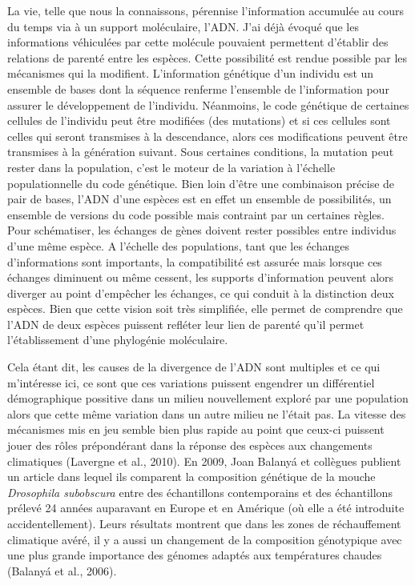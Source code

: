 La vie, telle que nous la connaissons, pérennise l'information accumulée
au cours du temps via à un support moléculaire, l'ADN. J'ai déjà évoqué
que les informations véhiculées par cette molécule pouvaient permettent
d'établir des relations de parenté entre les espèces. Cette possibilité
est rendue possible par les mécanismes qui la modifient. L'information
génétique d'un individu est un ensemble de bases dont la séquence
renferme l'ensemble de l'information pour assurer le développement de
l'individu. Néanmoins, le code génétique de certaines cellules de
l'individu peut être modifiées (des mutations) et si ces cellules sont
celles qui seront transmises à la descendance, alors ces modifications
peuvent être transmises à la génération suivant. Sous certaines
conditions, la mutation peut rester dans la population, c'est le moteur
de la variation à l'échelle populationnelle du code génétique. Bien loin
d'être une combinaison précise de pair de bases, l'ADN d'une espèces est
en effet un ensemble de possibilités, un ensemble de versions du code
possible mais contraint par un certaines règles. Pour schématiser, les
échanges de gènes doivent rester possibles entre individus d'une même
espèce. A l'échelle des populations, tant que les échanges
d'informations sont importants, la compatibilité est assurée mais
lorsque ces échanges diminuent ou même cessent, les supports
d'information peuvent alors diverger au point d'empêcher les échanges,
ce qui conduit à la distinction deux espèces. Bien que cette vision soit
très simplifiée, elle permet de comprendre que l'ADN de deux espèces
puissent refléter leur lien de parenté qu'il permet l'établissement
d'une phylogénie moléculaire.

Cela étant dit, les causes de la divergence de l'ADN sont multiples et
ce qui m'intéresse ici, ce sont que ces variations puissent engendrer un
différentiel démographique possitive dans un milieu nouvellement exploré
par une population alors que cette même variation dans un autre milieu
ne l'était pas. La vitesse des mécanismes mis en jeu semble bien plus
rapide au point que ceux-ci puissent jouer des rôles prépondérant dans
la réponse des espèces aux changements climatiques (Lavergne et al.,
2010). En 2009, Joan Balanyá et collègues publient un article dans
lequel ils comparent la composition génétique de la mouche
\emph{Drosophila subobscura} entre des échantillons contemporains et des
échantillons prélevé 24 années auparavant en Europe et en Amérique (où
elle a été introduite accidentellement). Leurs résultats montrent que
dans les zones de réchauffement climatique avéré, il y a aussi un
changement de la composition génotypique avec une plus grande importance
des génomes adaptés aux températures chaudes (Balanyá et al., 2006).

